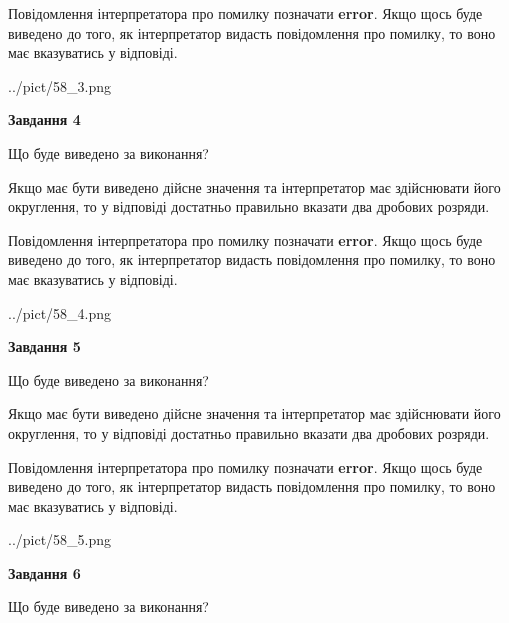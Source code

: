 \documentclass[12pt, ukrainian]{article}
\begin{document}
{\begin {Large}
Повідомлення інтерпретатора про помилку позначати \textbf{error}.
Якщо щось буде виведено до того, як інтерпретатор видасть повідомлення про помилку, 
то воно має вказуватись у відповіді. \par

\begin{center}
	{../pict/58_3.png}
\end{center}
\newpage

{\begin {center}\textbf{Завдання 4}\end {center}}\par
Що буде виведено за виконання? \par

Якщо має бути виведено дійсне значення та інтерпретатор має здійснювати його округлення, 
то у відповіді достатньо правильно вказати два дробових розряди.

Повідомлення інтерпретатора про помилку позначати \textbf{error}.
Якщо щось буде виведено до того, як інтерпретатор видасть повідомлення про помилку, 
то воно має вказуватись у відповіді. \par

\begin{center}
	{../pict/58_4.png}
\end{center}
\newpage

{\begin {center}\textbf{Завдання 5}\end {center}}\par
Що буде виведено за виконання? \par

Якщо має бути виведено дійсне значення та інтерпретатор має здійснювати його округлення, 
то у відповіді достатньо правильно вказати два дробових розряди.

Повідомлення інтерпретатора про помилку позначати \textbf{error}.
Якщо щось буде виведено до того, як інтерпретатор видасть повідомлення про помилку, 
то воно має вказуватись у відповіді. \par

\begin{center}
	{../pict/58_5.png}
\end{center}
\newpage

{\begin {center}\textbf{Завдання 6}\end {center}}\par
Що буде виведено за виконання? \par


\end{Large}}
\end{document}
